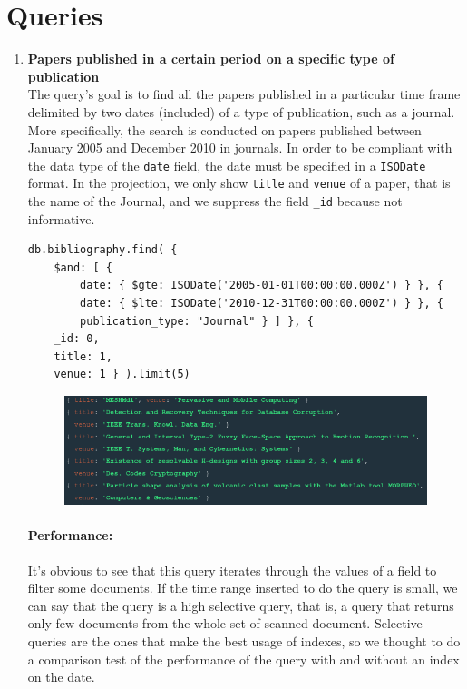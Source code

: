 \section{Queries}
\label{sec:queries_mongodb}%
\begin{enumerate}
    \item \textbf{Papers published in a certain period on a specific type of publication}\\
    The query's goal is to find all the papers published in a particular time frame delimited by two dates (included) of a type of publication, such as a journal.
    More specifically, the search is conducted on papers published between January 2005 and December 2010 in journals.
    In order to be compliant with the data type of the \verb|date| field, the date must be specified in a \verb|ISODate| format.
    In the projection, we only show \verb|title| and \verb|venue| of a paper, that is the name of the Journal, and we suppress the field \verb|_id| because not informative.
    \begin{lstlisting}[label={lst:lstlisting62}]
db.bibliography.find( {
    $and: [ {
        date: { $gte: ISODate('2005-01-01T00:00:00.000Z') } }, {
        date: { $lte: ISODate('2010-12-31T00:00:00.000Z') } }, {
        publication_type: "Journal" } ] }, {
    _id: 0,
    title: 1,
    venue: 1 } ).limit(5)
    \end{lstlisting}
    \begin{figure}[H]
        \begin{center}
            \includegraphics[width=.8\linewidth]{ImagesMongoDB/q6mongo}
            \label{fig:q6mongo}%
        \end{center}
    \end{figure}

    \paragraph{Performance:} It's obvious to see that this query iterates through the values of a field to filter some documents.
    If the time range inserted to do the query is small, we can say that the query is a high selective query, that is, a query that returns only few documents from the whole set of scanned document.
    Selective queries are the ones that make the best usage of indexes, so we thought to do a comparison test of the performance of the query with and without an index on the date.


\end{enumerate}

